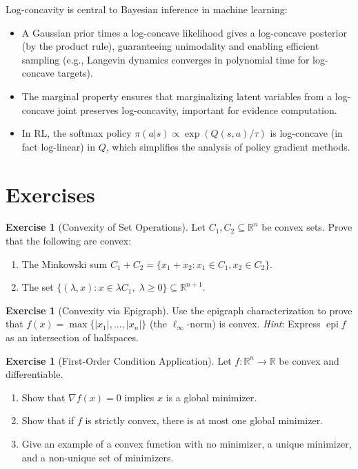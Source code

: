 \documentclass[11pt,a4paper]{article}
\theoremstyle{definition}
\newtheorem{exercise}[theorem]{Exercise}
\theoremstyle{remark}
\newcommand{\R}{\mathbb{R}}
\DeclareMathOperator{\epi}{epi}
\begin{document}
\begin{rlconnection}
Log-concavity is central to Bayesian inference in machine learning:
\begin{itemize}
  \item A Gaussian prior times a log-concave likelihood gives a log-concave posterior
        (by the product rule), guaranteeing unimodality and enabling efficient sampling
        (e.g., Langevin dynamics converges in polynomial time for log-concave targets).
  \item The marginal property ensures that marginalizing latent variables from a
        log-concave joint preserves log-concavity, important for evidence computation.
  \item In RL, the softmax policy $\pi(a|s) \propto \exp(Q(s,a)/\tau)$ is log-concave
        (in fact log-linear) in $Q$, which simplifies the analysis of policy gradient
        methods.
\end{itemize}
\end{rlconnection}

\section{Exercises}

\begin{exercise}[Convexity of Set Operations]
\label{ex:set-operations}
Let $C_1, C_2 \subseteq \R^n$ be convex sets. Prove that the following are convex:
\begin{enumerate}[label=(\alph*)]
  \item The Minkowski sum $C_1 + C_2 = \{x_1 + x_2 : x_1 \in C_1, x_2 \in C_2\}$.
  \item The set $\{(\lambda, x) : x \in \lambda C_1, \; \lambda \ge 0\}
        \subseteq \R^{n+1}$.
\end{enumerate}
\end{exercise}

\begin{exercise}[Convexity via Epigraph]
\label{ex:epigraph-exercise}
Use the epigraph characterization to prove that $f(x) = \max\{|x_1|, \ldots, |x_n|\}$
(the $\ell_\infty$-norm) is convex.
\textit{Hint}: Express $\epi f$ as an intersection of halfspaces.
\end{exercise}

\begin{exercise}[First-Order Condition Application]
\label{ex:first-order-app}
Let $f : \R^n \to \R$ be convex and differentiable.
\begin{enumerate}[label=(\alph*)]
  \item Show that $\nabla f(x) = 0$ implies $x$ is a global minimizer.
  \item Show that if $f$ is strictly convex, there is at most one global minimizer.
  \item Give an example of a convex function with no minimizer, a unique minimizer,
        and a non-unique set of minimizers.
\end{enumerate}
\end{exercise}
\end{document}
